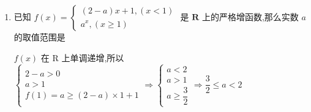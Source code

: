 \begin{enumerate}
    \item 已知 $f\left( x\right)  = \left\{  \begin{matrix} \left( {2 - a}\right) x + 1,\left( {x < 1}\right) \\  {a}^{x},\left( {x \geq  1}\right)  \end{matrix}\right.$ 是 $\mathbf{R}$ 上的严格增函数,那么实数 $a$ 的取值范围是
    \begin{jieda}
        $f\left( x\right)$ 在 $\mathrm{R}$ 上单调递增,所以 $\left\{  {\begin{matrix} 2 - a > 0 \\  a > 1 \\  f\left( 1\right)  = a \geq  \left( {2 - a}\right)  \times  1 + 1 \end{matrix} \Longrightarrow  \left\{  {\begin{matrix} a < 2 \\  a > 1 \\  a \geq  \dfrac{3}{2} \end{matrix} \Longrightarrow  \dfrac{3}{2} \leq  a < 2}\right. }\right.$
    \end{jieda}
\end{enumerate}
